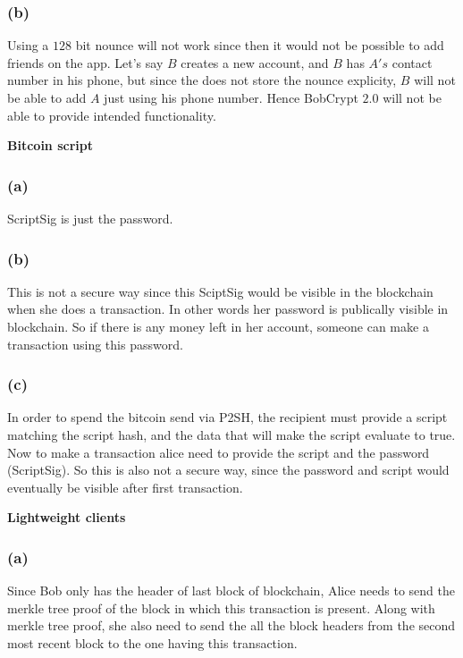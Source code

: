 \documentclass[a4paper]{article}
\begin{document}
\subsubsection*{(b)}
Using a $128$ bit nounce will not work since then it would not be possible to add friends on the app.
Let's say $B$ creates a new account, and $B$ has $A's$ contact number in his phone, but since the
does not store the nounce explicity, $B$ will not be able to add $A$ just using his phone number. Hence
BobCrypt $2.0$ will not be able to provide intended functionality.

\begin{question}
    \textbf{Bitcoin script}
\end{question}
\subsubsection*{(a)}
ScriptSig is just the password.

\subsubsection*{(b)}
This is not a secure way since this SciptSig would be visible in the blockchain when she does a transaction.
In other words her password is publically visible in blockchain. So if there is any money left
in her account, someone can make a transaction using this password.

\subsubsection*{(c)}
In order to spend the bitcoin send via P2SH, the recipient must provide a script matching the script hash,
and the data that will make the script evaluate to true. Now to make a transaction alice need to provide the script
and the password (ScriptSig). So this is also not a secure way, since the password and script would eventually be visible
after first transaction.


\begin{question}
    \textbf{Lightweight clients}
\end{question}

\subsubsection*{(a)}
Since Bob only has the header of last block of blockchain, Alice needs to send the merkle tree proof 
of the block in which this transaction is present. Along with merkle tree proof, she also need to 
send the all the block headers from the second most recent block to the one having this transaction. \\
\end{document}
